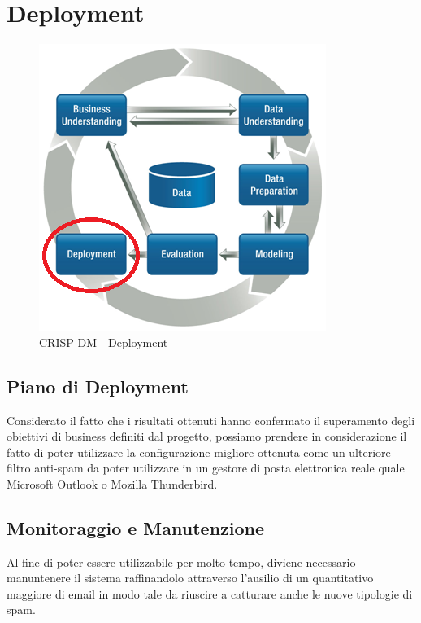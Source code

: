 \chapter{Deployment}

\begin{figure}[hbtp]
	\centering
	\includegraphics[width=0.35\linewidth]{./images/CRISPDM_6.png}
	\caption{CRISP-DM - Deployment}
	\label{CRISPDM_6}
\end{figure}
\section{Piano di Deployment}
Considerato il fatto che i risultati ottenuti hanno confermato il superamento degli obiettivi di business definiti dal progetto, possiamo prendere in considerazione il fatto di poter utilizzare la configurazione migliore ottenuta come un ulteriore filtro anti-spam da poter utilizzare in un gestore di posta elettronica reale quale Microsoft Outlook o Mozilla Thunderbird.
\section{Monitoraggio e Manutenzione}
Al fine di poter essere utilizzabile per molto tempo, diviene necessario manuntenere il sistema raffinandolo attraverso l'ausilio di un quantitativo maggiore di email in modo tale da riuscire a catturare anche le nuove tipologie di spam.
